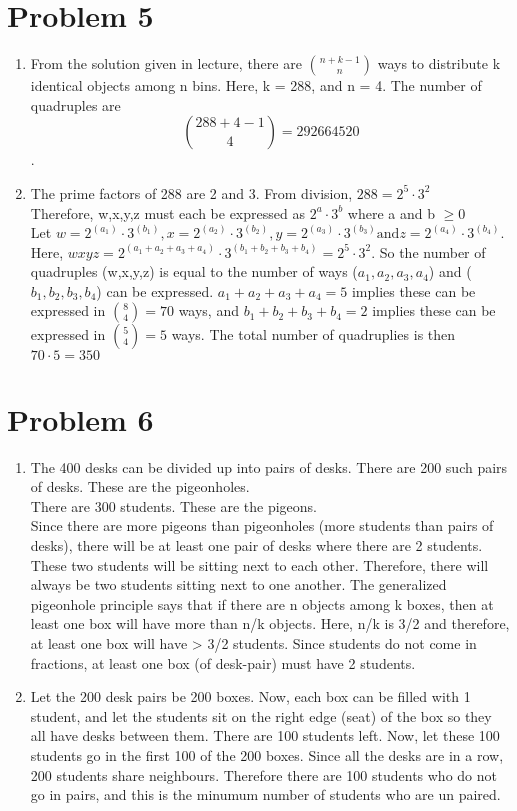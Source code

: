 \documentclass[english]{article}
\begin{document}
\section*{Problem 5}
\begin{enumerate} [label=\alph*]
\item From the solution given in lecture, there are $\binom{n + k - 1}{n}$ ways to distribute k identical objects among n bins. Here, k = 288, and n = 4. The number of quadruples are $$\binom{288 + 4 - 1}{4} = 292664520$$.
\item The prime factors of 288 are 2 and 3. From division, $ 288 = 2^5 \cdot 3^2$ \\
Therefore, w,x,y,z must each be expressed as $2^a \cdot 3^b$ where a and b $ \geq 0$
\\ Let $w = 2^{(a_1)} \cdot 3^{(b_1)}, x = 2^{(a_2)} \cdot 3^{(b_2)}, y = 2^{(a_3)} \cdot 3^{(b_3)} \text{and} z = 2^{(a_4)} \cdot 3^{(b_4)}$. Here, $wxyz = 2^{(a_1 + a_2 + a_3 + a_4)} \cdot 3^{(b_1 + b_2 + b_3 + b_4)} = 2^5 \cdot 3^2$. So the number of quadruples (w,x,y,z) is equal to the number of ways ($a_1,a_2,a_3,a_4$) and ($b_1,b_2,b_3,b_4$) can be expressed.
$a_1 + a_2 + a_3 + a_4 = 5$ implies these can be expressed in $\binom{8}{4} = 70$ ways, and $b_1 + b_2 + b_3 + b_4 = 2$ implies these can be expressed in $\binom{5}{4} = 5$ ways. The total number of quadruplies is then $70 \cdot 5 = 350$
\end{enumerate}
\section*{Problem 6}
\begin{enumerate} [label=\alph*]
\item The 400 desks can be divided up into pairs of desks. There are 200 such pairs of desks. These are the pigeonholes.
\\ There are 300 students. These are the pigeons.\\ Since there are more pigeons than pigeonholes (more students than pairs of desks), there will be at least one pair of desks where there are 2 students. These two students will be sitting next to each other. Therefore, there will always be two students sitting next to one another.
The generalized pigeonhole principle says that if there are n objects among k boxes, then at least one box will have more than n/k objects. Here, n/k is 3/2 and therefore, at least one box will have > 3/2 students. Since students do not come in fractions, at least one box (of desk-pair) must have 2 students.
\item Let the 200 desk pairs be 200 boxes. Now, each box can be filled with 1 student, and let the students sit on the right edge (seat) of the box so they all have desks between them. There are 100 students left. Now, let these 100 students go in the first 100 of the 200 boxes. Since all the desks are in a row, 200 students share neighbours. Therefore there are 100 students who do not go in pairs, and this is the minumum number of students who are un paired.
\end{enumerate}
\end{document}
